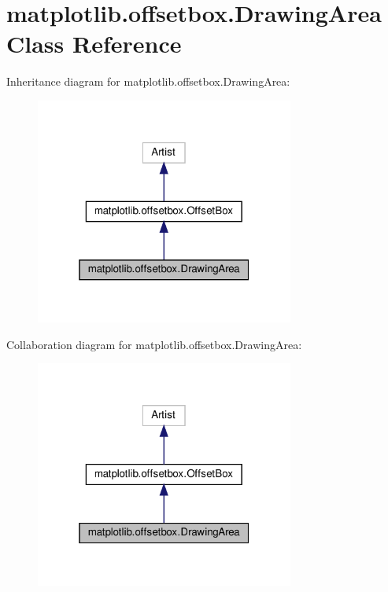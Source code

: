 \hypertarget{classmatplotlib_1_1offsetbox_1_1DrawingArea}{}\section{matplotlib.\+offsetbox.\+Drawing\+Area Class Reference}
\label{classmatplotlib_1_1offsetbox_1_1DrawingArea}


Inheritance diagram for matplotlib.\+offsetbox.\+Drawing\+Area\+:
\nopagebreak
\begin{figure}[H]
\begin{center}
\leavevmode
\includegraphics[width=241pt]{classmatplotlib_1_1offsetbox_1_1DrawingArea__inherit__graph}
\end{center}
\end{figure}


Collaboration diagram for matplotlib.\+offsetbox.\+Drawing\+Area\+:
\nopagebreak
\begin{figure}[H]
\begin{center}
\leavevmode
\includegraphics[width=241pt]{classmatplotlib_1_1offsetbox_1_1DrawingArea__coll__graph}
\end{center}
\end{figure}
